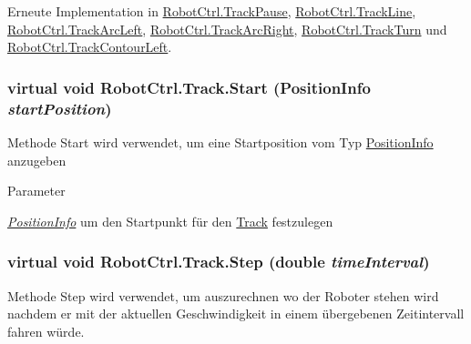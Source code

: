Erneute Implementation in \hyperlink{class_robot_ctrl_1_1_track_pause_a47133c69e455aa2c04f1bc3a6b5999b6}{RobotCtrl.TrackPause}, \hyperlink{class_robot_ctrl_1_1_track_line_ad73ae0e8f7aea1765834ab90f5bd6b23}{RobotCtrl.TrackLine}, \hyperlink{class_robot_ctrl_1_1_track_arc_left_aee8e8c1da176807436c2946e39bbd6ae}{RobotCtrl.TrackArcLeft}, \hyperlink{class_robot_ctrl_1_1_track_arc_right_a7b2db0d3709e4919da0645a6713a87bb}{RobotCtrl.TrackArcRight}, \hyperlink{class_robot_ctrl_1_1_track_turn_a065e23cd313e746cb65496c9b9df0955}{RobotCtrl.TrackTurn} und \hyperlink{class_robot_ctrl_1_1_track_contour_left_ae7938250af614625cd08a498c0f15195}{RobotCtrl.TrackContourLeft}.

\hypertarget{class_robot_ctrl_1_1_track_a91c0b372e1c332ae1aa18368df116633}{
\subsubsection[{Start}]{\setlength{\rightskip}{0pt plus 5cm}virtual void RobotCtrl.Track.Start ({\bf PositionInfo} {\em startPosition})}}
\label{class_robot_ctrl_1_1_track_a91c0b372e1c332ae1aa18368df116633}
Methode Start wird verwendet, um eine Startposition vom Typ \hyperlink{struct_robot_ctrl_1_1_position_info}{PositionInfo} anzugeben


\begin{DoxyParams}{Parameter}
\item[{\em \hyperlink{struct_robot_ctrl_1_1_position_info}{PositionInfo}}]um den Startpunkt für den \hyperlink{class_robot_ctrl_1_1_track}{Track} festzulegen \end{DoxyParams}
\hypertarget{class_robot_ctrl_1_1_track_a82386b9a49faa6a31d9706f39238f21b}{
\subsubsection[{Step}]{\setlength{\rightskip}{0pt plus 5cm}virtual void RobotCtrl.Track.Step (double {\em timeInterval})}}
\label{class_robot_ctrl_1_1_track_a82386b9a49faa6a31d9706f39238f21b}
Methode Step wird verwendet, um auszurechnen wo der Roboter stehen wird nachdem er mit der aktuellen Geschwindigkeit in einem \"{u}bergebenen Zeitintervall fahren würde.


